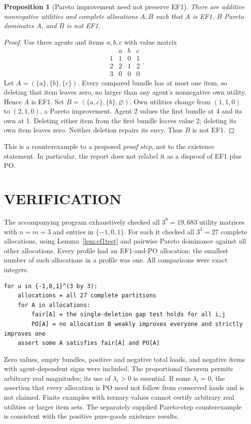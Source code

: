 \documentclass[11pt,a4paper]{article}
\newtheorem{proposition}[theorem]{Proposition}
\theoremstyle{remark}\newtheorem{remark}[theorem]{Remark}
\begin{document}
\begin{proposition}[Pareto improvement need not preserve EF1]\label{prop:badroute}
There are additive nonnegative utilities and complete allocations $A,B$ such that $A$ is EF1, $B$ Pareto dominates $A$, and $B$ is not EF1.
\end{proposition}
\begin{proof}
Use three agents and items $a,b,c$ with value matrix
\[
\begin{array}{c|rrr}&a&b&c\\\hline
1&1&0&1\\2&2&1&2\\3&0&0&0
\end{array}.
\]
Let $A=(\{a\},\{b\},\{c\})$. Every compared bundle has at most one item, so deleting that item leaves zero, no larger than any agent's nonnegative own utility. Hence $A$ is EF1. Set $B=(\{a,c\},\{b\},\varnothing)$. Own utilities change from $(1,1,0)$ to $(2,1,0)$, a Pareto improvement. Agent 2 values the first bundle at 4 and its own at 1. Deleting either item from the first bundle leaves value 2; deleting its own item leaves zero. Neither deletion repairs its envy. Thus $B$ is not EF1.
\end{proof}
This is a counterexample to a proposed \emph{proof step}, not to the existence statement. In particular, the report does not relabel it as a disproof of EF1 plus PO.

\section{VERIFICATION}
The accompanying program exhaustively checked all $3^9=19{,}683$ utility matrices with $n=m=3$ and entries in $\{-1,0,1\}$. For each it checked all $3^3=27$ complete allocations, using Lemma~\ref{lem:ef1test} and pairwise Pareto dominance against all other allocations. Every profile had an EF1-and-PO allocation; the smallest number of such allocations in a profile was one. All comparisons were exact integers.
\begin{lstlisting}
for u in {-1,0,1}^(3 by 3):
    allocations = all 27 complete partitions
    for A in allocations:
        fair[A] = the single-deletion gap test holds for all i,j
        PO[A] = no allocation B weakly improves everyone and strictly improves one
    assert some A satisfies fair[A] and PO[A]
\end{lstlisting}
Zero values, empty bundles, positive and negative total loads, and negative items with agent-dependent signs were included. The proportional theorem permits arbitrary real magnitudes; its use of $\lambda_i>0$ is essential. If some $\lambda_i=0$, the assertion that every allocation is PO need not follow from conserved loads and is not claimed. Finite examples with ternary values cannot certify arbitrary real utilities or larger item sets. The separately supplied Pareto-step counterexample is consistent with the positive pure-goods existence results.
\end{document}
